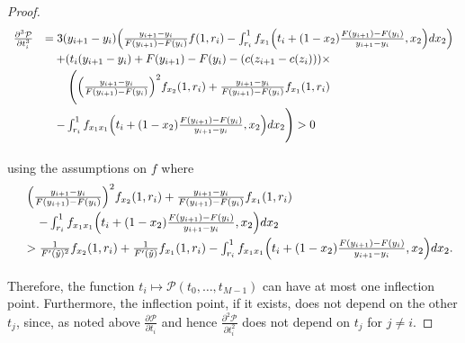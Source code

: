 \documentclass[12pt,reqno]{amsart}
\begin{document}
\begin{proof}
\[\begin{array}{ll}
\frac{\partial^3\mathcal{P}}{\partial t_i^3}&=3(y_{i+1}-y_i)\Big(\frac{y_{i+1}-y_i}{F(y_{i+1})-F(y_i)}f(1,r_i)-\int_{r_i}^1 f_{x_1}\Big(t_i+(1-x_2)\frac{F(y_{i+1})-F(y_{i})}{y_{i+1}-y_{i}},x_2\Big)dx_2\Big)\vspace{3pt}\\
&\quad+(t_i(y_{i+1}-y_i)+F(y_{i+1})-F(y_i)-(c(z_{i+1}-c(z_i)))\times\vspace{3pt}\\
&\quad\quad\Bigg(\Big(\frac{y_{i+1}-y_i}{F(y_{i+1})-F(y_i)}\Big)^2f_{x_2}(1,r_i)+\frac{y_{i+1}-y_i}{F(y_{i+1})-F(y_i)}f_{x_1}(1,r_i)\vspace{3pt}\\
&\quad-\int_{r_i}^1 f_{x_1x_1}\Big(t_i+(1-x_2)\frac{F(y_{i+1})-F(y_{i})}{y_{i+1}-y_{i}},x_2\Big)dx_2\Bigg)>0\vspace{3pt}\\




\end{array}\]

using the assumptions on $f$ where
\[\begin{array}{ll}
    
&\Big(\frac{y_{i+1}-y_i}{F(y_{i+1})-F(y_i)}\Big)^2f_{x_2}(1,r_i)+\frac{y_{i+1}-y_i}{F(y_{i+1})-F(y_i)}f_{x_1}(1,r_i)\vspace{3pt}\\
&\quad-\int_{r_i}^1 f_{x_1x_1}\Big(t_i+(1-x_2)\frac{F(y_{i+1})-F(y_{i})}{y_{i+1}-y_{i}},x_2\Big)dx_2\vspace{3pt}\\
&>\frac{1}{F'(\Tilde{y})^2} f_{x_2}(1,r_i)+\frac{1}{F'(\Tilde{y})}f_{x_1}(1,r_i)-\int_{r_i}^1 f_{x_1x_1}\Big(t_i+(1-x_2)\frac{F(y_{i+1})-F(y_{i})}{y_{i+1}-y_{i}},x_2\Big)dx_2.\vspace{3pt}\\

\end{array}\]


Therefore, the function $t_i \mapsto \mathcal{P}(t_0,\dots,t_{M-1})$ can have at most one inflection point.  Furthermore, the inflection point, if it exists, does not depend on the other $t_j$, since, as noted above $\frac{\partial\mathcal{P}}{\partial t_i}$ and hence $\frac{\partial^2\mathcal{P}}{\partial t_i^2}$ does not depend on $t_j$ for $j \neq i$.


\end{proof}
\end{document}
